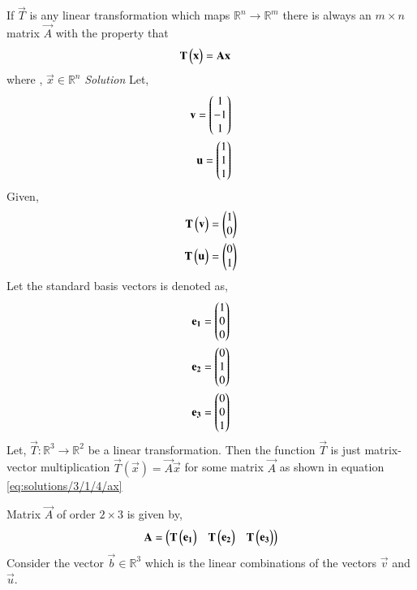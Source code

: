 If  $\vec{T}$  is any linear transformation which maps $\mathbb{R}^n \rightarrow  \mathbb{R}^m$ there is always an $m\times n$  matrix  $\vec{A}$  with the property that
\begin{align}
    \mathbf{T}\begin{pmatrix}\mathbf{x}\end{pmatrix} &=\mathbf{A}\mathbf{x}\notag
\end{align}
where , $\vec{x} \in \mathbb{R}^n$
{\em Solution}
Let,
\begin{align}
    \mathbf{v}=\begin{pmatrix}1\\-1\\1\end{pmatrix}\\
    \mathbf{u}=\begin{pmatrix}1\\1\\1\end{pmatrix}
\end{align}
Given,
\begin{align}
    \mathbf{T}\begin{pmatrix}\mathbf{v}\end{pmatrix}=\begin{pmatrix}1\\0\end{pmatrix}\\
    \mathbf{T}\begin{pmatrix}\mathbf{u}\end{pmatrix}=\begin{pmatrix}0\\1\end{pmatrix}
\end{align}
Let the standard basis vectors is denoted as, 
\begin{align}
    \mathbf{e_1}&=\begin{pmatrix}1\\0\\0\end{pmatrix}\\
    \mathbf{e_2}&=\begin{pmatrix}0\\1\\0\end{pmatrix}\\
    \mathbf{e_3}&=\begin{pmatrix}0\\0\\1\end{pmatrix}
\end{align}
Let, 
$\vec{T} :\mathbb{R}^3 \rightarrow  \mathbb{R}^2$ be a linear transformation. Then the function $\vec{T}$ is just matrix-vector multiplication $\vec{T}(\vec{x}) = \vec{A}\vec{x}$ for some matrix $\vec{A}$ as shown in equation \eqref{eq:solutions/3/1/4/ax}

Matrix $\vec{A}$ of order $2 \times 3$ is given by,
\begin{align}
    \mathbf{A}=\begin{pmatrix}\mathbf{T}\begin{pmatrix}\mathbf{e_1}\end{pmatrix} & \mathbf{T}\begin{pmatrix}\mathbf{e_2}\end{pmatrix} & \mathbf{T}\begin{pmatrix}\mathbf{e_3}\end{pmatrix}\end{pmatrix}\label{eq:solutions/3/1/4/A}
\end{align}
Consider the vector $\vec{b} \in \mathbb{R}^3$ which is the linear combinations of the vectors $\vec{v}$ and $\vec{u}$.


